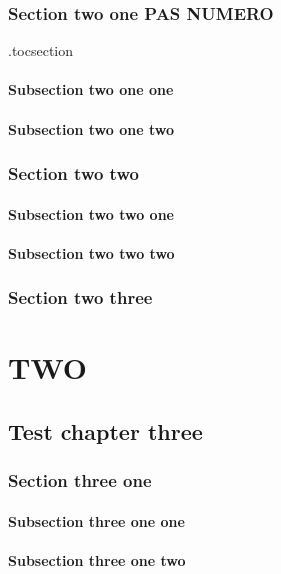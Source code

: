 \documentclass{book}
\begin{document}
\section*{Section two one PAS NUMERO}

\etocsetlocaltop.toc{section}
\localtableofcontents

\subsection{Subsection two one one}
\subsection{Subsection two one two}
\section{Section two two}
\subsection{Subsection two two one}
\subsection{Subsection two  two two}
\section{Section two three}
\localtableofcontents\label{emptytoc}

\part{TWO}
\localtableofcontents*  %

\chapter{Test chapter three}
\section{Section three one}
\subsection{Subsection three one one}
\subsection{Subsection three one two}
\end{document}
